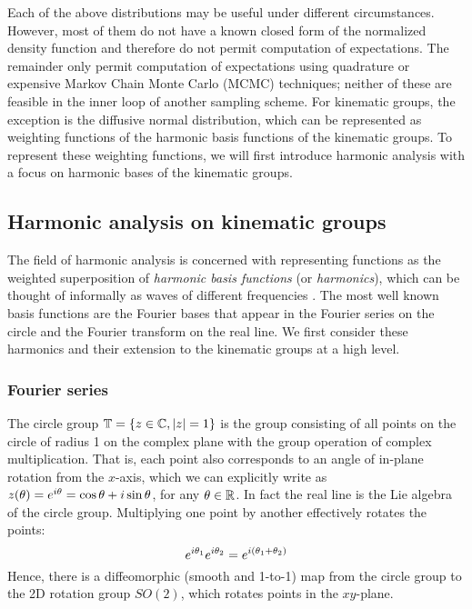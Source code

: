 \documentclass[../main.tex]{subfiles}
\begin{document}
\begin{refsection}
\begin{enumerate}
\end{enumerate}
Each of the above distributions may be useful under different circumstances.
However, most of them do not have a known closed form of the normalized density function and therefore do not permit computation of expectations.
The remainder only permit computation of expectations using quadrature or expensive Markov Chain Monte Carlo (MCMC) techniques; neither of these are feasible in the inner loop of another sampling scheme.
For kinematic groups, the exception is the diffusive normal distribution, which can be represented as weighting functions of the harmonic basis functions of the kinematic groups.
To represent these weighting functions, we will first introduce harmonic analysis with a focus on harmonic bases of the kinematic groups.

\subsection{Harmonic analysis on kinematic groups}\label{harmonic-analysis-on-kinematic-groups}

The field of harmonic analysis is concerned with representing functions as the weighted superposition of \emph{harmonic basis functions} (or \emph{harmonics}), which can be thought of informally as waves of different frequencies \cite{chirikjian_harmonic_2016}.
The most well known basis functions are the Fourier bases that appear in the Fourier series on the circle and the Fourier transform on the real line.
We first consider these harmonics and their extension to the kinematic groups at a high level.


\subsubsection{Fourier series}\label{fourier-series}


The circle group $\mathbb{T} = \{z \in \mathbb{C}, |z| = 1\}$ is the group consisting of all points on the circle of radius 1 on the complex plane with the group operation of complex multiplication.
That is, each point also corresponds to an angle of in-plane rotation from the $x$-axis, which we can explicitly write as $z(\theta) = e^{i\theta} = \cos\theta + i \sin\theta$, for any $\theta \in \mathbb{R}$.
In fact the real line is the Lie algebra of the circle group.
Multiplying one point by another effectively rotates the points:
\[e^{i\theta_1} e^{i\theta_2} = e^{i (\theta_1 + \theta_2)}\]
Hence, there is a diffeomorphic (smooth and 1-to-1) map from the circle group to the 2D rotation group $SO(2)$, which rotates points in the $xy$-plane. 


\end{refsection}
\end{document}
